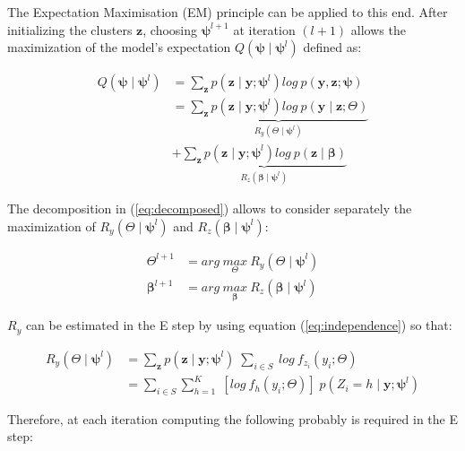 The Expectation Maximisation \cite{dempster77} (EM) principle can be applied to this end. After initializing the clusters $\boldsymbol{z}$,  choosing $\boldsymbol{\psi}^{l+1}$ at iteration $(l+1)$ allows the maximization of the model's expectation $Q(\boldsymbol{\psi} \mid \boldsymbol{\psi}^{l})$ defined as:

\begin{align}
Q(\boldsymbol{\psi} \mid \boldsymbol{\psi}^{l}) &= \sum\limits_{\boldsymbol{z}} p(\boldsymbol{z} \mid \boldsymbol{y} ; \boldsymbol{\psi}^{l}) log\:p(\boldsymbol{y},\boldsymbol{z};\boldsymbol{\psi}) \nonumber\\ 
\label{eq:decomposed}
&= \underbrace{\sum\limits_{\boldsymbol{z}} p(\boldsymbol{z} \mid \boldsymbol{y} ; \boldsymbol{\psi}^{l}) log\:p(\boldsymbol{y} \mid \boldsymbol{z} ; \Theta)}_{R_y(\Theta\mid \boldsymbol{\psi}^l)} \nonumber\\
 &+ \underbrace{\sum\limits_{\boldsymbol{z}} p(\boldsymbol{z} \mid \boldsymbol{y} ; \boldsymbol{\psi}^{l}) log\:p(\boldsymbol{z} \mid \boldsymbol{\beta})}_{R_z(\boldsymbol{\beta}\mid \boldsymbol{\psi}^l)}
\end{align}

The decomposition in (\ref{eq:decomposed}) allows to consider separately the maximization of $R_y(\Theta\mid \boldsymbol{\psi}^l)$ and $R_z(\boldsymbol{\beta}\mid \boldsymbol{\psi}^l)$:


\begin{align*}
\Theta^{l+1} &= arg\:\underset{\Theta}{max}\:R_y(\Theta\mid \boldsymbol{\psi}^l)\\
\boldsymbol{\beta}^{l+1} &= arg\:\underset{\boldsymbol{\beta}}{max}\:R_z(\boldsymbol{\beta}\mid \boldsymbol{\psi}^l)
\end{align*}

$R_y$ can be estimated in the E step by using equation (\ref{eq:independence}) so that:

\begin{align*}
R_y(\Theta\mid \boldsymbol{\psi}^l) &= \sum\limits_{\boldsymbol{z}} p(\boldsymbol{z}\mid \boldsymbol{y} ; \boldsymbol{\psi}^{l})\;\sum\limits_{i \in S}\: log\: f_{z_i} (y_i ; \Theta)\\
&= \sum\limits_{i \in S} \sum\limits_{h=1}^{K}\; \left[log\: f_{h} (y_i  ; \Theta) \right] \; p(Z_i = h \mid \boldsymbol{y};\boldsymbol{\psi}^{l})
\end{align*}  

Therefore, at each iteration computing the following probably is required in the E step:

